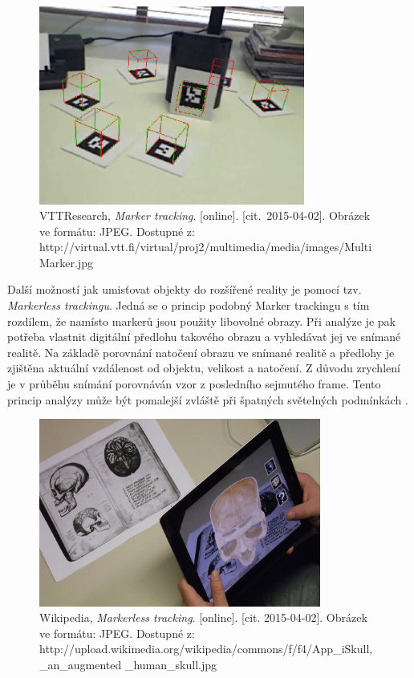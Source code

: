 \documentclass[twoside,12pt]{article}
\begin{document}
\begin{figure}[H]
    \includegraphics[width=330px, center]{images/marker-tracking.jpg}
    \caption{VTTResearch, \textit{Marker tracking}.
	[online]. [cit.~2015-04-02]. Obrázek ve formátu: JPEG. Dostupné z: http://virtual.vtt.fi/virtual/proj2/multimedia/media/images/MultiMarker.jpg}
    \label{marker_tracking}
\end{figure}

Další možností jak umisťovat objekty do rozšířené reality je pomocí tzv. \textit{Markerless trackingu}. Jedná se o princip podobný Marker trackingu s tím rozdílem, že namísto markerů jsou použity libovolné obrazy. Při analýze je pak potřeba vlastnit digitální předlohu takového obrazu a vyhledávat jej ve snímané realitě. Na základě porovnání natočení obrazu ve snímané realitě a předlohy je zjištěna aktuální vzdálenost od objektu, velikost a natočení. Z důvodu zrychlení je v průběhu snímání porovnáván vzor z posledního sejmutého frame. Tento princip analýzy může být pomalejší zvláště při špatných světelných podmínkách \cite{handbook_of_ar}.

\begin{figure}[H]
    \includegraphics[width=350px, center]{images/markerless-tracking.jpg}
    \caption{Wikipedia, \textit{Markerless tracking}. [online]. [cit. 2015-04-02].
	Obrázek ve formátu: JPEG. Dostupné z: http://upload.wikimedia.org/wikipedia/commons/f/f4/App\_iSkull,\_an\_augmented \_human\_skull.jpg}
    \label{markerless_tracking}
\end{figure}
\end{document}
